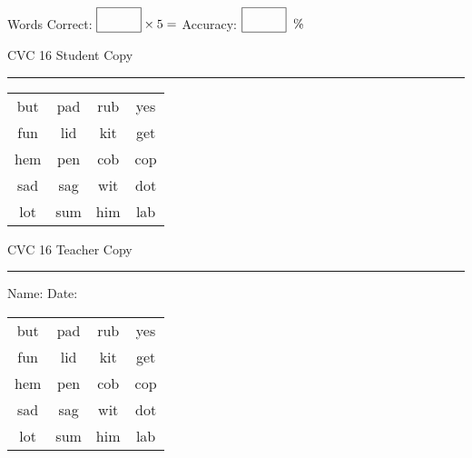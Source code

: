 \documentclass{memoir}
\begin{document}
\small

Words Correct: $\fbox{\phantom{\huge 100}} \times 5 = $ Accuracy: $\fbox{\phantom{\huge 100}}\;\; \%$ 

\vfill

\newpage


\footnotesize \noindent
CVC 16 \hfill Student Copy
\smallskip
\hrule

\Large

\setlength{\tabcolsep}{14pt}
\def\arraystretch{2}

{\selectfont


\begin{vplace}[0.5]
\begin{center}
\begin{tabular}{cccc}
but & pad & rub & yes \\
fun & lid & kit & get \\
hem & pen & cob & cop \\
sad & sag & wit & dot \\
lot & sum & him & lab \\
\end{tabular}
\end{center}
\end{vplace}

}

\newpage

\footnotesize \noindent
CVC 16 \hfill Teacher Copy
\smallskip
\hrule

\small

\vfill

\noindent
Name: \underline{\hspace{1.75in}} \hfill Date: \underline{\hspace{1in}}

\Large

{\selectfont


\begin{vplace}[0.5]
\begin{center}
\begin{tabular}{cccc}
but & pad & rub & yes \\
fun & lid & kit & get \\
hem & pen & cob & cop \\
sad & sag & wit & dot \\
lot & sum & him & lab \\
\end{tabular}
\end{center}
\end{vplace}



}
\end{document}
